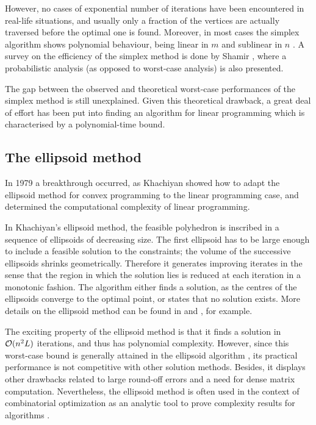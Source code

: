 However, no cases of exponential number of iterations have been encountered 
in real-life situations, and usually only a fraction of the vertices
are actually traversed before the optimal one is found.
Moreover, in most cases the simplex algorithm shows 
polynomial behaviour, being linear in $m$ and sublinear in $n$
\cite[p.94]{FangPuthenpura93}.
A survey on the efficiency of the simplex method is done by Shamir 
\cite{Shamir87}, where a probabilistic analysis (as opposed to
worst-case analysis) is also presented.

The gap between the observed and theoretical worst-case performances
of the simplex method is still unexplained.
Given this theoretical drawback, a great deal of effort 
has been put into finding an
algorithm for linear programming which is 
characterised by a polynomial-time bound.

%
%
\subsection{The ellipsoid method}

In 1979 a breakthrough occurred, as Khachiyan showed how to adapt 
the ellipsoid method for convex programming to the linear programming case,
and determined the computational complexity of linear programming.

In Khachiyan's ellipsoid method, the feasible polyhedron is inscribed in 
a sequence of ellipsoids of decreasing size. 
The first ellipsoid has to be large enough to include a feasible 
solution to the constraints; the volume of the successive ellipsoids 
shrinks geometrically. Therefore it generates improving iterates
in the sense that the region in which the solution lies is 
reduced at each iteration in a monotonic fashion.
The algorithm either finds a solution, as the centres of the ellipsoids
converge to the optimal point, or states that no solution exists.
More details on the ellipsoid method can be found in 
\cite[Chapter~13]{Schrijver86} and \cite[Chapter~I.6]{ip:NemhauserWolsey88},
for example.

The exciting property of the ellipsoid method is that it finds a 
solution in $\mathcal{O}(n^2L)$ iterations, and thus has polynomial complexity. 
However, since this worst-case bound
is generally attained in the ellipsoid algorithm \cite{GoldfarbTodd82},
its practical performance is not competitive
with other solution methods. Besides, it displays other drawbacks
related to large round-off errors and a need for dense matrix computation.
Nevertheless, the ellipsoid method is often used in the context of
combinatorial optimization as an analytic tool to prove complexity
results for algorithms \cite{ip:NemhauserWolsey88}.

